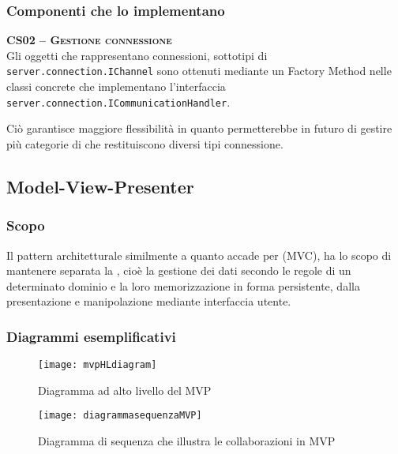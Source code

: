 \subsubsection{Componenti che lo implementano}
\begin{description}

  \item{\scshape\bfseries CS02 -- Gestione connessione}\\
Gli oggetti che rappresentano connessioni, sottotipi di \texttt{server.connection.IChannel} sono ottenuti mediante un Factory Method nelle classi concrete che implementano l'interfaccia \texttt{server.connection.ICommunicationHandler}.

Ciò garantisce maggiore flessibilità in quanto permetterebbe in futuro di gestire più categorie di  che restituiscono diversi tipi connessione.
\end{description}

\subsection{Model-View-Presenter}\label{sec:MVP}

\subsubsection{Scopo}
Il pattern architetturale  similmente a quanto accade per  (MVC), ha lo scopo di mantenere separata la , cioè la gestione dei dati secondo le regole di un determinato dominio e la loro memorizzazione in forma persistente, dalla presentazione e manipolazione mediante interfaccia utente.

\subsubsection{Diagrammi esemplificativi}
\begin{figure}[H]
  \centering
  \texttt{[image: mvpHLdiagram]}
  \caption{Diagramma ad alto livello del  MVP}\label{fig:mvpHL}
\end{figure}

\begin{figure}[H]
  \centering
  \texttt{[image: diagrammasequenzaMVP]}
  \caption{Diagramma di sequenza che illustra le collaborazioni in MVP}\label{fig:mvpSD}
\end{figure}

